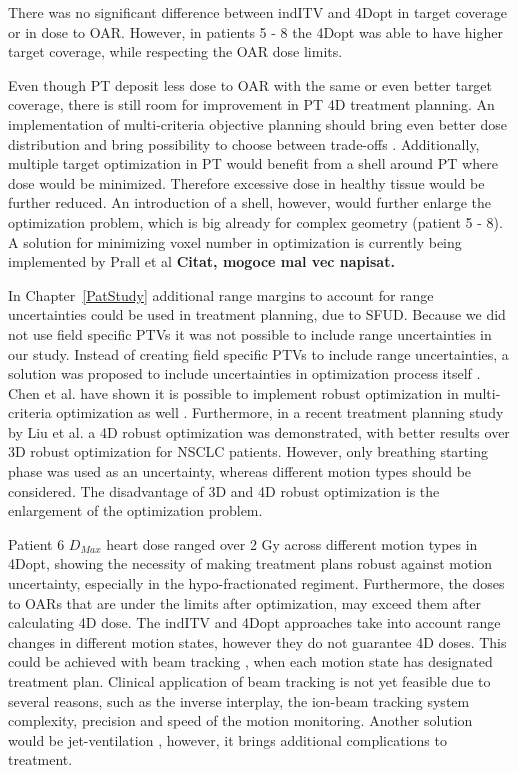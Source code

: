 \documentclass[type=dr, dr=rernat, accentcolor=tud7b,colorbacktitle, bigchapter, openright, twoside, 12pt ]{tudthesis}
\begin{document}
There was no significant difference between indITV and 4Dopt in target coverage or in dose to OAR. However, in patients 5 - 8 the 4Dopt was able to have higher target coverage, while respecting the OAR dose limits.

Even though PT deposit less dose to OAR with the same or even better target coverage, there is still room for improvement in PT 4D treatment planning. 
An implementation of multi-criteria objective planning should bring even better dose distribution and bring possibility to choose between trade-offs \cite{Breedveld2007, Chen2010}. 
Additionally, multiple target optimization in PT would benefit from a shell around PT where dose would be minimized. Therefore excessive dose
in healthy tissue would be further reduced. An introduction of a shell, however, would further enlarge the optimization problem, which is big already for complex geometry (patient 5 - 8). 
A solution for minimizing voxel number in optimization is currently being implemented by Prall et al \textbf{Citat, mogoce mal vec napisat.} 

In Chapter~\ref{PatStudy} additional range margins to account for range uncertainties could be used in treatment planning, due to SFUD. 
Because we did not use field specific PTVs it was not possible to include range uncertainties in our study.
Instead of creating field specific PTVs to include range uncertainties, a solution was proposed to include uncertainties in optimization process itself \cite{Pflugfelder2008, Unkelbach2009, Fredriksson2011, Chen2012}.
Chen et al. have shown it is possible to implement robust optimization in multi-criteria optimization as well \cite{Chen2012}. Furthermore, in a recent treatment planning study by Liu et al. \cite{Liu2016}
a 4D robust optimization was demonstrated, with better results over 3D robust optimization for NSCLC patients. However, only breathing starting phase was used as an uncertainty,
whereas different motion types should be considered. The disadvantage of 3D and 4D robust optimization is the enlargement of the optimization problem.

Patient 6 $D_{Max}$ heart dose ranged over 2 Gy across different motion types in 4Dopt, showing the necessity of making treatment plans robust against motion uncertainty, 
especially in the hypo-fractionated regiment. Furthermore, the doses to OARs that are under the limits after optimization, may exceed them after calculating 4D dose. 
The indITV and 4Dopt approaches take into account range changes in different motion states, however they do not guarantee 4D doses. This could be achieved with beam tracking \cite{Bert2007}, 
when each motion state has designated treatment plan. Clinical application of beam tracking is not yet feasible due to several reasons, such as the 
inverse interplay, the ion-beam tracking system complexity, precision and speed of the motion monitoring.
Another solution would be jet-ventilation \cite{Santiago2013}, however, it brings additional complications to treatment.
\end{document}
